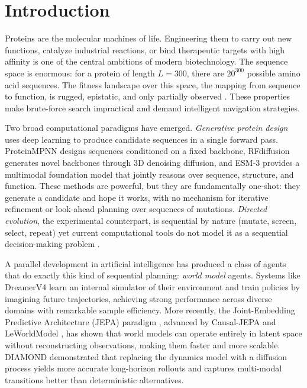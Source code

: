 \documentclass[12pt, a4paper]{article}
\begin{document}
\section{Introduction}
\label{sec:introduction}

Proteins are the molecular machines of life. Engineering them to carry out new functions, catalyze industrial reactions, or bind therapeutic targets with high affinity is one of the central ambitions of modern biotechnology. The sequence space is enormous: for a protein of length $L = 300$, there are $20^{300}$ possible amino acid sequences. The fitness landscape over this space, the mapping from sequence to function, is rugged, epistatic, and only partially observed \citep{sandhu2025landscapes}. These properties make brute-force search impractical and demand intelligent navigation strategies.

Two broad computational paradigms have emerged. \textit{Generative protein design} uses deep learning to produce candidate sequences in a single forward pass. ProteinMPNN \citep{dauparas2022proteinmpnn} designs sequences conditioned on a fixed backbone, RFdiffusion \citep{watson2023rfdiffusion} generates novel backbones through 3D denoising diffusion, and ESM-3 \citep{hayes2024esm3} provides a multimodal foundation model that jointly reasons over sequence, structure, and function. These methods are powerful, but they are fundamentally one-shot: they generate a candidate and hope it works, with no mechanism for iterative refinement or look-ahead planning over sequences of mutations. \textit{Directed evolution}, the experimental counterpart, is sequential by nature (mutate, screen, select, repeat) yet current computational tools do not model it as a sequential decision-making problem \citep{notin2024mlprotein, kyro2025review}.

A parallel development in artificial intelligence has produced a class of agents that do exactly this kind of sequential planning: \textit{world model} agents. Systems like DreamerV4 \citep{hafner2023dreamerv3} learn an internal simulator of their environment and train policies by imagining future trajectories, achieving strong performance across diverse domains with remarkable sample efficiency. More recently, the Joint-Embedding Predictive Architecture (JEPA) paradigm \citep{lecun2022path}, advanced by Causal-JEPA \citep{nam2026causaljepa} and LeWorldModel \citep{maes2026leworldmodel}, has shown that world models can operate entirely in latent space without reconstructing observations, making them faster and more scalable. DIAMOND \citep{alonso2024diamond} demonstrated that replacing the dynamics model with a diffusion process yields more accurate long-horizon rollouts and captures multi-modal transitions better than deterministic alternatives.
\end{document}
